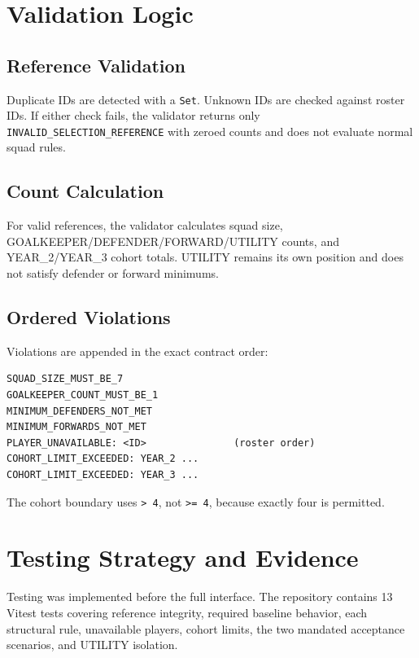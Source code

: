 \documentclass[11pt,a4paper]{article}
\begin{document}
\section{Validation Logic}
\subsection{Reference Validation}
Duplicate IDs are detected with a \texttt{Set}. Unknown IDs are checked against roster IDs. If either check fails, the validator returns only \texttt{INVALID\_SELECTION\_REFERENCE} with zeroed counts and does not evaluate normal squad rules.

\subsection{Count Calculation}
For valid references, the validator calculates squad size, GOALKEEPER/DEFENDER/FORWARD/UTILITY counts, and YEAR\_2/YEAR\_3 cohort totals. UTILITY remains its own position and does not satisfy defender or forward minimums.

\subsection{Ordered Violations}
Violations are appended in the exact contract order:
\begin{lstlisting}
SQUAD_SIZE_MUST_BE_7
GOALKEEPER_COUNT_MUST_BE_1
MINIMUM_DEFENDERS_NOT_MET
MINIMUM_FORWARDS_NOT_MET
PLAYER_UNAVAILABLE: <ID>               (roster order)
COHORT_LIMIT_EXCEEDED: YEAR_2 ...
COHORT_LIMIT_EXCEEDED: YEAR_3 ...
\end{lstlisting}
The cohort boundary uses \texttt{> 4}, not \texttt{>= 4}, because exactly four is permitted.

\section{Testing Strategy and Evidence}
Testing was implemented before the full interface. The repository contains 13 Vitest tests covering reference integrity, required baseline behavior, each structural rule, unavailable players, cohort limits, the two mandated acceptance scenarios, and UTILITY isolation.
\end{document}
